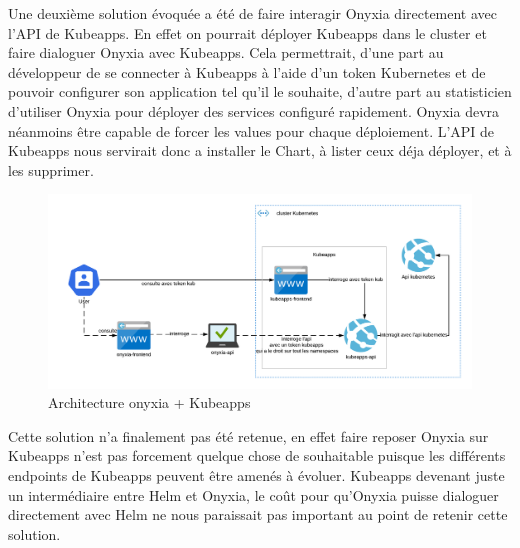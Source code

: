 \documentclass[11pt,fleqn]{book} %
\begin{document}
Une deuxième solution évoquée a été de faire interagir Onyxia directement avec l'API de Kubeapps. En effet on pourrait déployer Kubeapps dans le cluster et faire dialoguer Onyxia avec Kubeapps. Cela permettrait, d'une part au développeur de se connecter à Kubeapps à l'aide d'un token Kubernetes et de pouvoir configurer son application tel qu'il le souhaite, d'autre part au statisticien d'utiliser Onyxia pour déployer des services configuré rapidement. Onyxia devra néanmoins être capable de forcer les values pour chaque déploiement. L'API de Kubeapps nous servirait donc a installer le Chart, à lister ceux déja déployer, et à les supprimer. 
\begin{figure}[H]
\renewcommand{\figurename}{Schéma}
\hspace{-3cm}
\includegraphics[scale=0.8]{Pictures/onyxia/Kubeapps.png}
\captionsetup{margin=1.5cm,format=hang,justification=justified}
\caption[]{Architecture onyxia + Kubeapps \newline}
\end{figure}

Cette solution n'a finalement pas été retenue, en effet faire reposer Onyxia sur Kubeapps n'est pas forcement quelque chose de souhaitable puisque les différents endpoints de Kubeapps peuvent être amenés à évoluer. Kubeapps devenant juste un intermédiaire entre Helm et Onyxia, le coût pour qu'Onyxia  puisse dialoguer directement avec Helm ne nous paraissait pas important au point de retenir cette solution.




\end{document}
